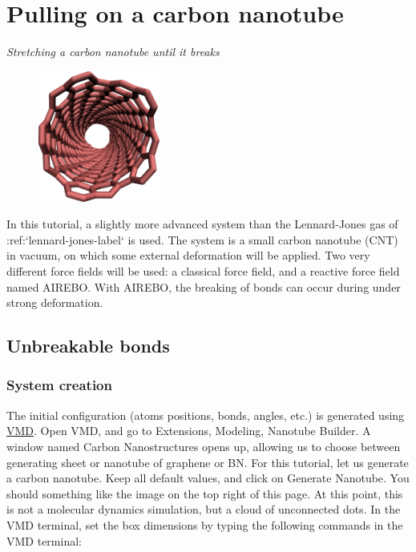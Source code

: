 \chapter{Pulling on a carbon nanotube}

\vspace{-1cm} \noindent \textcolor{graytitle}{\textit{{\Large Stretching a carbon nanotube until it breaks}}\vspace{0.5cm} }

\noindent \hspace{-0.45cm}\begin{figure}
\includegraphics[width=4cm]{tutorials/level1/breaking-a-carbon-nanotube/CNT_light.png}
\end{figure}

\noindent In this tutorial, a slightly more advanced system than the Lennard-Jones gas
of :ref:`lennard-jones-label` is used.
The system is a small carbon nanotube (CNT) in vacuum, on which some external 
deformation will be applied. Two very different force fields will be used: 
a classical force field, and a reactive force field named AIREBO. With AIREBO,
the breaking of bonds can occur during under strong deformation.

\section{Unbreakable bonds}

\noindent \subsection{System creation}

The initial configuration (atoms positions, bonds, angles,
etc.) is generated using \href{https://www.ks.uiuc.edu/Research/vmd/}{VMD}. Open VMD,
and go to Extensions, Modeling, Nanotube Builder. A window
named Carbon Nanostructures opens up, allowing us to choose
between generating sheet or nanotube of graphene or BN. For
this tutorial, let us generate a carbon nanotube.
Keep all default values, and click on Generate
Nanotube. You should something like the image on the top right 
of this page.
At this point, this is not a molecular dynamics simulation,
but a cloud of unconnected dots. In the VMD terminal, set the
box dimensions by typing the following commands in the VMD terminal:

